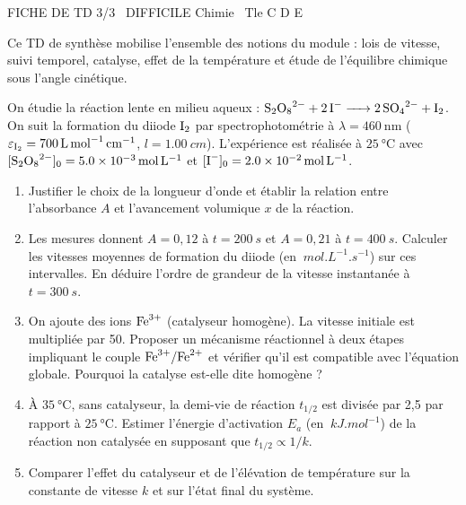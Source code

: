 \documentclass[11pt]{article}
\begin{document}
\begin{tcolorbox}[enhanced,colback=popink,colframe=popink,arc=10pt,boxrule=0pt,left=12pt,right=12pt,top=9pt,bottom=9pt]
{\color{white}\popxbold\small FICHE DE TD 3/3 \textbullet\ DIFFICILE \hfill Chimie \textbullet\ Tle C D E\par}
\end{tcolorbox}
\vspace{4pt}
Ce TD de synthèse mobilise l'ensemble des notions du module : lois de vitesse, suivi temporel, catalyse, effet de la température et étude de l'équilibre chimique sous l'angle cinétique.

\begin{exercice}
On étudie la réaction lente en milieu aqueux : $\ce{S2O8^{2-} + 2 I- -> 2 SO4^{2-} + I2}$.
On suit la formation du diiode $\ce{I2}$ par spectrophotométrie à $\lambda = \SI{460}{\nano\meter}$ ($\varepsilon_{\ce{I2}} = \SI{700}{L.mol^{-1}.cm^{-1}}$, $l = \SI{1.00}{cm}$).
L'expérience est réalisée à $\SI{25}{\celsius}$ avec $[\ce{S2O8^{2-}}]_0 = \SI{5.0e-3}{mol.L^{-1}}$ et $[\ce{I-}]_0 = \SI{2.0e-2}{mol.L^{-1}}$.
\begin{enumerate}
    \item Justifier le choix de la longueur d'onde et établir la relation entre l'absorbance $A$ et l'avancement volumique $x$ de la réaction.
    \item Les mesures donnent $A = 0,12$ à $t = \SI{200}{s}$ et $A = 0,21$ à $t = \SI{400}{s}$. Calculer les vitesses moyennes de formation du diiode (en $\SI{}{mol.L^{-1}.s^{-1}}$) sur ces intervalles. En déduire l'ordre de grandeur de la vitesse instantanée à $t = \SI{300}{s}$.
    \item On ajoute des ions $\ce{Fe^{3+}}$ (catalyseur homogène). La vitesse initiale est multipliée par 50. Proposer un mécanisme réactionnel à deux étapes impliquant le couple $\ce{Fe^{3+}/Fe^{2+}}$ et vérifier qu'il est compatible avec l'équation globale. Pourquoi la catalyse est-elle dite homogène ?
    \item À $\SI{35}{\celsius}$, sans catalyseur, la demi-vie de réaction $t_{1/2}$ est divisée par 2,5 par rapport à $\SI{25}{\celsius}$. Estimer l'énergie d'activation $E_a$ (en $\SI{}{kJ.mol^{-1}}$) de la réaction non catalysée en supposant que $t_{1/2} \propto 1/k$.
    \item Comparer l'effet du catalyseur et de l'élévation de température sur la constante de vitesse $k$ et sur l'état final du système.
\end{enumerate}
\end{exercice}
\end{document}
